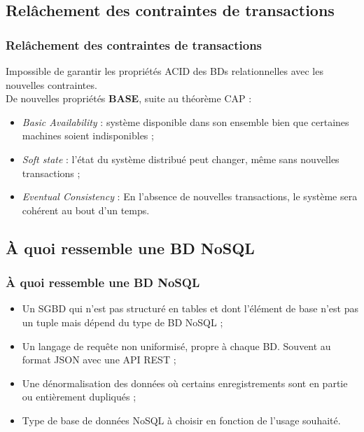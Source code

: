 	\subsection{Relâchement des contraintes de transactions}
	\begin{frame}
		\frametitle{Relâchement des contraintes de transactions}

		Impossible de garantir les propriétés ACID des BDs relationnelles avec les nouvelles contraintes.\\
		\vspace{10px}
		De nouvelles propriétés \textbf{BASE}, suite au théorème CAP :
		\begin{itemize}
			\item \textit{Basic Availability} : système disponible dans son ensemble bien que certaines machines soient indisponibles ;
			\item \textit{Soft state} : l'état du système distribué peut changer, même sans nouvelles transactions ;
			\item \textit{Eventual Consistency} : En l'absence de nouvelles transactions, le système sera cohérent au bout d'un temps.
		\end{itemize}

	\end{frame}

	\subsection{À quoi ressemble une BD NoSQL}
	\begin{frame}
		\frametitle{À quoi ressemble une BD NoSQL}

		\begin{itemize}
			\item Un SGBD qui n'est pas structuré en tables et dont l'élément de base n'est pas un tuple mais dépend du type de BD NoSQL ;
			\item Un langage de requête non uniformisé, propre à chaque BD. Souvent au format JSON avec une API REST ;
			\item Une dénormalisation des données où certains enregistrements sont en partie ou entièrement dupliqués ;
			\item Type de base de données NoSQL à choisir en fonction de l'usage souhaité.
		\end{itemize}

	\end{frame}